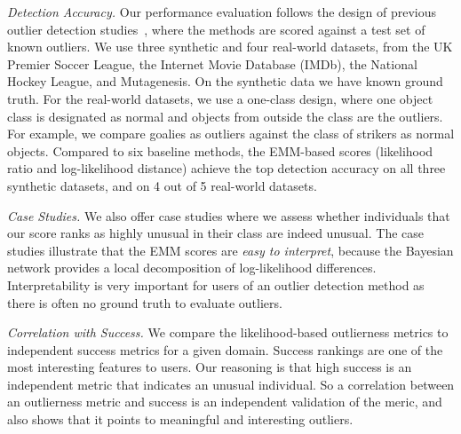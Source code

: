 {{\em Detection Accuracy.} Our performance evaluation follows the design of previous outlier detection studies~\cite{Gao2010,aggarwal2013},
where the methods are scored against a test set of known outliers.  
%
We use three synthetic and four real-world datasets, from the UK Premier Soccer League, the Internet Movie Database (IMDb), the National Hockey League, and Mutagenesis. On the synthetic data we have known ground truth. For the real-world datasets, we use a one-class design, where one object class is designated as normal and objects from outside the class are the outliers. For example, we compare goalies as outliers against the class of strikers as normal objects. 
Compared to six baseline methods, the EMM-based scores (likelihood ratio and log-likelihood distance) achieve the top detection accuracy on all three synthetic datasets, and on 4 out of 5 real-world datasets.

{\em Case Studies.} We also offer case studies where we assess whether individuals that our score ranks as highly unusual in their class are  indeed unusual. 
The case studies illustrate that the EMM scores are {\em easy to interpret}, because the Bayesian network provides a local decomposition of log-likelihood differences. Interpretability is very important for users of an outlier detection method as there is often no ground truth to 
evaluate outliers.%

{\em Correlation with Success.} We compare the likelihood-based outlierness metrics to independent success metrics for a given domain. Success rankings are one of the most interesting features to users. Our reasoning is that high success is an independent metric that indicates an unusual individual. So a correlation between an outlierness metric and success is an independent validation of the meric, and also shows that it points to meaningful and interesting outliers.

}
